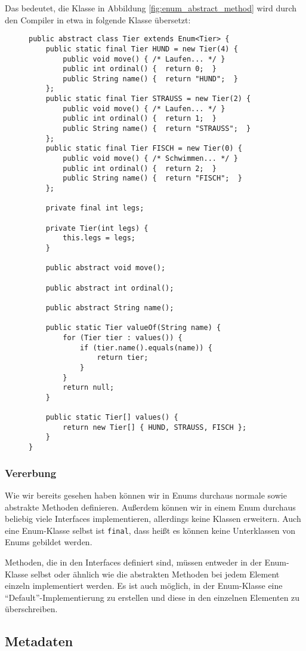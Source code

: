 		Das bedeutet, die Klasse in Abbildung \ref{fig:enum_abstract_method} wird durch den Compiler in etwa in folgende Klasse übersetzt:
		\begin{figure}[H]
			\centering
			\begin{lstlisting}
public abstract class Tier extends Enum<Tier> {
	public static final Tier HUND = new Tier(4) {
		public void move() { /* Laufen... */ }
		public int ordinal() {  return 0;  }
		public String name() {  return "HUND";  }
	};
	public static final Tier STRAUSS = new Tier(2) {
		public void move() { /* Laufen... */ }
		public int ordinal() {  return 1;  }
		public String name() {  return "STRAUSS";  }
	};
	public static final Tier FISCH = new Tier(0) {
		public void move() { /* Schwimmen... */ }
		public int ordinal() {  return 2;  }
		public String name() {  return "FISCH";  }
	};

	private final int legs;

	private Tier(int legs) {
		this.legs = legs;
	}

	public abstract void move();

	public abstract int ordinal();

	public abstract String name();

	public static Tier valueOf(String name) {
		for (Tier tier : values()) {
			if (tier.name().equals(name)) {
				return tier;
			}
		}
		return null;
	}

	public static Tier[] values() {
		return new Tier[] { HUND, STRAUSS, FISCH };
	}
}
\end{lstlisting}
		\end{figure}
	
	\subsubsection{Vererbung}
		Wie wir bereits gesehen haben können wir in Enums durchaus normale sowie abstrakte Methoden definieren. Außerdem können wir in einem Enum durchaus beliebig viele Interfaces implementieren, allerdings keine Klassen erweitern. Auch eine Enum-Klasse selbst ist \lstinline|final|, dass heißt es können keine Unterklassen von Enums gebildet werden.
		
		Methoden, die in den Interfaces definiert sind, müssen entweder in der Enum-Klasse selbst oder ähnlich wie die abstrakten Methoden bei jedem Element einzeln implementiert werden. Es ist auch möglich, in der Enum-Klasse eine \enquote{Default}-Implementierung zu erstellen und diese in den einzelnen Elementen zu überschreiben.

\subsection{Metadaten}
	
